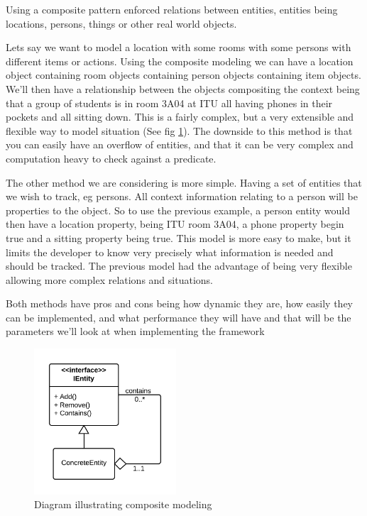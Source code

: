 \documentclass[]{report}
\begin{document}
Using a composite pattern enforced relations between entities, entities being locations, persons, things or other real world objects.

Lets say we want to model a location with some rooms with some persons with different items or actions. Using the composite modeling we can have a location object containing room objects containing person objects containing item objects. We'll then have a relationship between the objects compositing the context being that a group of students is in room 3A04 at ITU all having phones in their pockets and all sitting down. This is a fairly complex, but a very extensible and flexible way to model situation (See fig \ref{fig:composite}). The downside to this method is that you can easily have an overflow of entities, and that it can be very complex and computation heavy to check against a  predicate.

The other method we are considering is more simple. Having a set of entities that we wish to track, eg persons. All context information relating to a person will be properties to the object. So to use the previous example, a person entity would then have a location property, being ITU room 3A04, a phone property begin true and a sitting property being true. This model is more easy to make, but it limits the developer to know very precisely what information is needed and should be tracked. The previous model had the advantage of being very flexible allowing more complex relations and situations. 

Both methods have pros and cons being how dynamic they are, how easily they can be implemented, and what performance they will have and that will be the parameters we'll look at when implementing the framework 

\begin{figure}
\centering
\includegraphics[width=200px]{composite.png}
\caption{Diagram illustrating composite modeling}
\label{fig:composite}
\end{figure}
\end{document}
